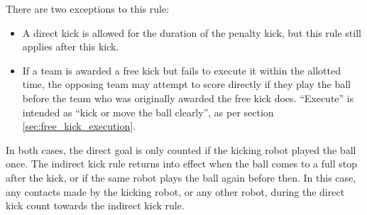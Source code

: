 There are two exceptions to this rule:

\begin{itemize}
  \item A direct kick is allowed for the duration of the penalty kick, but this rule still applies after this kick.
  \item If a team is awarded a free kick but fails to execute it within the allotted time, the opposing team may attempt to score directly if they play the ball before the team who was originally awarded the free kick does.
    ``Execute'' is intended as ``kick or move the ball clearly'', as per section \cref{sec:free_kick_execution}.
\end{itemize}

In both cases, the direct goal is only counted if the kicking robot played the ball once.
The indirect kick rule returns into effect when the ball comes to a full stop after the kick, or if the same robot plays the ball again before then.
In this case, any contacts made by the kicking robot, or any other robot, during the direct kick count towards the indirect kick rule.


